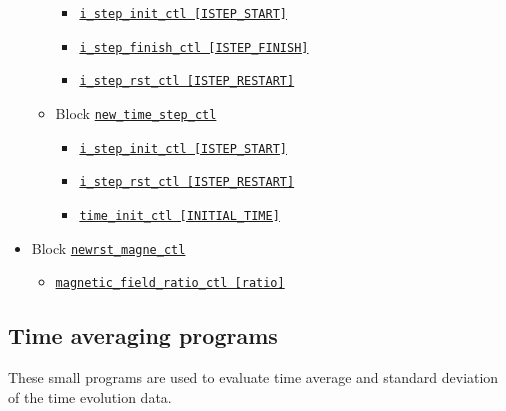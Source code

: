 \begin{itemize}
\begin{itemize}
		\begin{itemize} \label{href_i:time_step_ctl2}
		\item \hyperref[href_t:i_step_init_ctl]
			{\tt i\_step\_init\_ctl        [ISTEP\_START]}
		\item \hyperref[href_t:i_step_finish_ctl]
			{\tt i\_step\_finish\_ctl      [ISTEP\_FINISH]}
		\item \hyperref[href_t:i_step_rst_ctl]
			{\tt i\_step\_rst\_ctl         [ISTEP\_RESTART]}
		\end{itemize}
%
	\item  Block \hyperref[href_t:i_step_init_ctl]{\tt new\_time\_step\_ctl}
		\begin{itemize} \label{href_i:new_time_step_ctl}
		\item \hyperref[href_t:i_step_init_ctl_a]
			{\tt i\_step\_init\_ctl        [ISTEP\_START]}
		\item \hyperref[href_t:i_step_rst_ctl_a]
			{\tt i\_step\_rst\_ctl         [ISTEP\_RESTART]}
		\item \hyperref[href_t:time_init_ctl_a]
			{\tt time\_init\_ctl           [INITIAL\_TIME]}
		\end{itemize}
	\end{itemize}
%
\item Block \hyperref[href_t:newrst_magne_ctl]{\tt newrst\_magne\_ctl}
	\begin{itemize} \label{href_i:newrst_magne_ctl}
	\item \hyperref[href_t:magnetic_field_ratio_ctl]
		{\tt magnetic\_field\_ratio\_ctl    [ratio]}
	\end{itemize}
\end{itemize}

\subsection{Time averaging programs}
These small programs are used to evaluate time average and standard deviation of the time evolution data.
